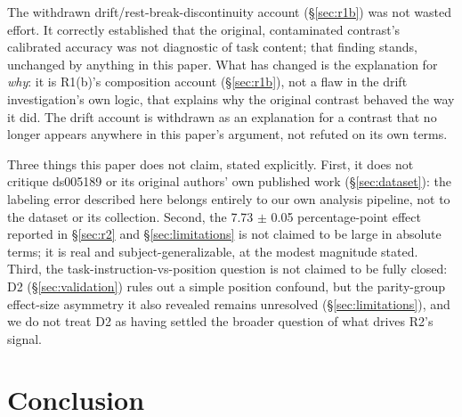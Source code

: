 \documentclass[preprint,12pt]{elsarticle}
\begin{document}
The withdrawn drift/rest-break-discontinuity account (\S\ref{sec:r1b}) was not wasted effort. It correctly established that the original, contaminated contrast's calibrated accuracy was not diagnostic of task content; that finding stands, unchanged by anything in this paper. What has changed is the explanation for \emph{why}: it is R1(b)'s composition account (\S\ref{sec:r1b}), not a flaw in the drift investigation's own logic, that explains why the original contrast behaved the way it did. The drift account is withdrawn as an explanation for a contrast that no longer appears anywhere in this paper's argument, not refuted on its own terms.

Three things this paper does not claim, stated explicitly. First, it does not critique ds005189 or its original authors' own published work (\S\ref{sec:dataset}): the labeling error described here belongs entirely to our own analysis pipeline, not to the dataset or its collection. Second, the 7.73 $\pm$ 0.05 percentage-point effect reported in \S\ref{sec:r2} and \S\ref{sec:limitations} is not claimed to be large in absolute terms; it is real and subject-generalizable, at the modest magnitude stated. Third, the task-instruction-vs-position question is not claimed to be fully closed: D2 (\S\ref{sec:validation}) rules out a simple position confound, but the parity-group effect-size asymmetry it also revealed remains unresolved (\S\ref{sec:limitations}), and we do not treat D2 as having settled the broader question of what drives R2's signal.

\section{Conclusion}\label{sec:conclusion}
\end{document}
